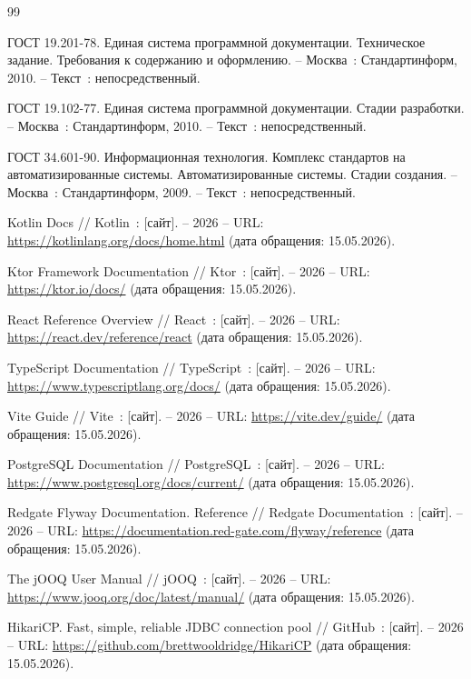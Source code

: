 
\begin{thebibliography}{99}

     ГОСТ 19.201-78. Единая система программной документации. Техническое задание. Требования к содержанию и оформлению. -- Москва~: Стандартинформ, 2010. -- Текст~: непосредственный.

     ГОСТ 19.102-77. Единая система программной документации. Стадии разработки. -- Москва~: Стандартинформ, 2010. -- Текст~: непосредственный.

     ГОСТ 34.601-90. Информационная технология. Комплекс стандартов на автоматизированные системы. Автоматизированные системы. Стадии создания. -- Москва~: Стандартинформ, 2009. -- Текст~: непосредственный.

     Kotlin Docs // Kotlin~: [сайт]. -- 2026 -- URL: \url{https://kotlinlang.org/docs/home.html} (дата обращения: 15.05.2026).

     Ktor Framework Documentation // Ktor~: [сайт]. -- 2026 -- URL: \url{https://ktor.io/docs/} (дата обращения: 15.05.2026).

     React Reference Overview // React~: [сайт]. -- 2026 -- URL: \url{https://react.dev/reference/react} (дата обращения: 15.05.2026).

     TypeScript Documentation // TypeScript~: [сайт]. -- 2026 -- URL: \url{https://www.typescriptlang.org/docs/} (дата обращения: 15.05.2026).

     Vite Guide // Vite~: [сайт]. -- 2026 -- URL: \url{https://vite.dev/guide/} (дата обращения: 15.05.2026).

     PostgreSQL Documentation // PostgreSQL~: [сайт]. -- 2026 -- URL: \url{https://www.postgresql.org/docs/current/} (дата обращения: 15.05.2026).

     Redgate Flyway Documentation. Reference // Redgate Documentation~: [сайт]. -- 2026 -- URL: \url{https://documentation.red-gate.com/flyway/reference} (дата обращения: 15.05.2026).

     The jOOQ User Manual // jOOQ~: [сайт]. -- 2026 -- URL: \url{https://www.jooq.org/doc/latest/manual/} (дата обращения: 15.05.2026).

     HikariCP. Fast, simple, reliable JDBC connection pool // GitHub~: [сайт]. -- 2026 -- URL: \url{https://github.com/brettwooldridge/HikariCP} (дата обращения: 15.05.2026).


\end{thebibliography}
